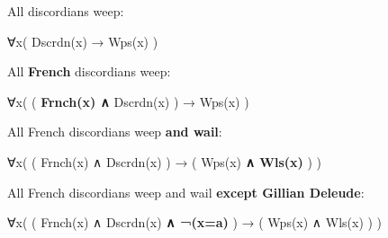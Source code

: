 \documentclass[12pt]{extarticle}
\begin{document}
\begin{multicols*}{3}
\begin{minipage}{\columnwidth}
All discordians weep:
 
∀x( Dscrdn(x) → Wps(x) )
 
\end{minipage}
 
\begin{minipage}{\columnwidth}
 
All \textbf{French} discordians weep:
 
∀x( ( \textbf{Frnch(x) ∧} Dscrdn(x) ) → Wps(x) )
 
\end{minipage}
 
\begin{minipage}{\columnwidth}
 
All French discordians weep \textbf{and wail}:
 
∀x( ( Frnch(x) ∧ Dscrdn(x) ) → ( Wps(x) \textbf{ ∧ Wls(x)} ) )
 
\end{minipage}
 
\begin{minipage}{\columnwidth}
 
All French discordians weep and wail \textbf{except Gillian Deleude}:
 
∀x( ( Frnch(x) ∧ Dscrdn(x) \textbf{∧ ¬(x=a)} ) → ( Wps(x) ∧ Wls(x) ) )
 
\end{minipage}
 
\vfill


 


\end{multicols*}
\end{document}
